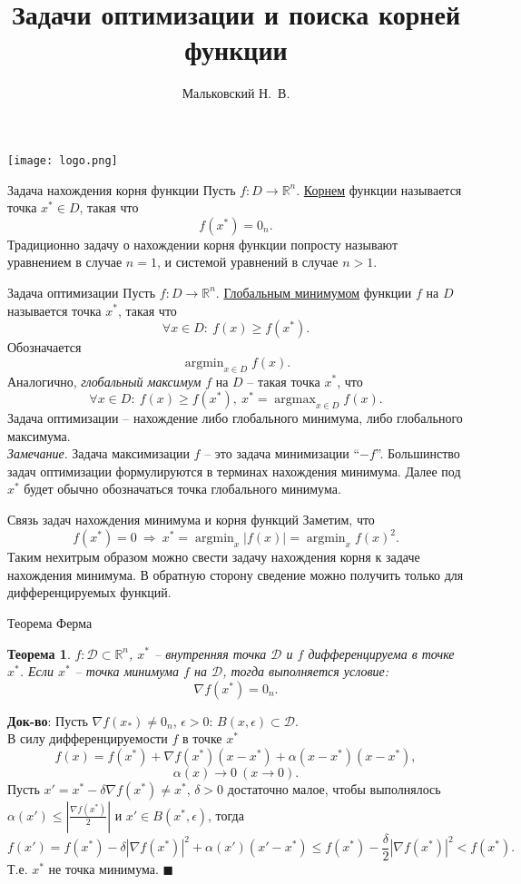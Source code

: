 \documentclass[10pt]{beamer}
\author{Мальковский Н.~В.}
\title[Введение]{Задачи оптимизации и поиска корней функции}
\institute[СПбAУ]{Санкт-Петербургский Академический Университет}
\date{}
\DeclareMathOperator*{\argmin}{argmin}
\DeclareMathOperator*{\argmax}{argmax}
\newtheorem{theorem_ru}{Теорема}[]
\begin{document}
\begin{frame}
\titlepage
\centering
\texttt{[image: logo.png]}
\end{frame}

\begin{frame}{Задача нахождения корня функции}
Пусть $f:D\rightarrow \mathbb{R}^n$. \underline{Корнем} функции называется точка $x^*\in D$, такая что 
$$
f(x^*)=0_n.
$$
Традиционно задачу о нахождении корня функции попросту называют уравнением в случае $n=1$, и системой уравнений в случае $n>1$.
\end{frame}

\begin{frame}{Задача оптимизации}
Пусть $f:D\rightarrow \mathbb{R}^n$. \underline{Глобальным минимумом} функции $f$ на $D$ называется точка $x^*$, такая что
$$
\forall x\in D:~f(x)\geq f(x^*).
$$
\pause
Обозначается$$
\argmin_{x\in D} f(x).
$$
\pause
Аналогично, \textit{глобальный максимум} $f$ на $D$ -- такая точка $x^*$, что
$$
\forall x\in D:~f(x)\geq f(x^*),~x^*=\argmax_{x\in D} f(x).
$$
\pause
Задача оптимизации -- нахождение либо глобального минимума, либо глобального максимума.\\
\vspace{1em}
\pause
\textit{Замечание}. Задача максимизации $f$ -- это задача минимизации ``$-f$''. Большинство задач оптимизации формулируются в терминах нахождения минимума. Далее под $x^*$ будет обычно обозначаться точка глобального минимума.
\end{frame}

\begin{frame}{Связь задач нахождения минимума и корня функций}
Заметим, что
$$
f(x^*)=0~\Rightarrow~x^*=\argmin_x|f(x)|=\argmin_xf(x)^2.
$$
\pause
Таким нехитрым образом можно свести задачу нахождения корня к задаче нахождения минимума. В обратную сторону сведение можно получить только для дифференцируемых функций.
\end{frame}
\begin{frame}{Теорема Ферма}
\begin{theorem_ru}
$f:\mathcal{D}\subset \mathbb{R}^n$, $x^*$ -- внутренняя точка $\mathcal{D}$ и $f$ дифференцируема в точке $x^*$. Если $x^*$ -- точка минимума $f$ на $\mathcal{D}$, тогда выполняется условие:
$$
\nabla f(x^*)=0_n.
$$
\end{theorem_ru}
\pause
\textbf{Док-во}:
Пусть $\nabla f(x_*)\neq 0_n$, $\epsilon>0$: $B(x, \epsilon)\subset \mathcal{D}$.\\
В силу дифференцируемости $f$ в точке $x^*$
$$
f(x)=f(x^*)+\nabla f(x^*)(x-x^*)+\alpha(x-x^*)(x-x^*),
$$
$$
\alpha(x)\rightarrow 0~(x\rightarrow 0).
$$ 
\pause
Пусть $x'=x^*-\delta \nabla f(x^*)\neq x^*$, $\delta>0$ достаточно малое, чтобы выполнялось $\alpha(x')\leq |\frac{\nabla f(x^*)}{2}|$ и $x'\in B(x^*, \epsilon)$, тогда
$$
f(x')=f(x^*)-\delta|\nabla f(x^*)|^2+\alpha(x')(x'-x^*)\leq
f(x^*)-\frac{\delta}{2}|\nabla f(x^*)|^2< f(x^*).
$$
Т.е. $x^*$ не точка минимума. $\blacksquare$
\end{frame}
\end{document}
